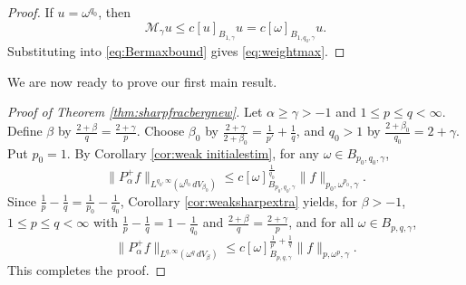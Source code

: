 \documentclass[a4paper,11pt,intlimits,oneside]{amsart}
\theoremstyle{definition}
\numberwithin{equation}{section}
\theoremstyle{definition}
\begin{document}
\begin{proof}
If $u=\omega^{q_0}$, then $$\mathcal{M}_{\gamma}u\le c[u]_{B_{1,\gamma}}u=c[\omega]_{B_{1,q_0,\gamma}}u.$$
Substituting into \eqref{eq:Bermaxbound} gives \eqref{eq:weightmax}.
\end{proof}
We are now ready to prove our first main result.
\begin{proof}[Proof of Theorem \ref{thm:sharpfracbergnew}]
Let $\alpha\geq \gamma>-1$ and $1\leq p\leq q<\infty$. Define $\beta$ by $\frac{2+\beta}{q}=\frac{2+\gamma}{p}$. Choose $\beta_0$ by $\frac{2+\gamma}{2+\beta_0}=\frac{1}{p'}+\frac{1}{q}$, and $q_0>1$ by $\frac{2+\beta_0}{q_0}=2+\gamma$. Put $p_0=1$. By Corollary \ref{cor:weak initialestim}, for any $\omega\in B_{p_0,q_0,\gamma}$,
$$\|P_{\alpha}^+f\|_{L^{q_0,\infty}(\omega^{q_0}\,{d}V_{\beta_0})}\le c[\omega]_{B_{p_0,q_0,\gamma}}^{\frac{1}{q_0}}\|f\|_{p_0,\omega^{p_0},\gamma}.$$
Since $\frac{1}{p}-\frac{1}{q}=\frac{1}{p_0}-\frac{1}{q_0}$, Corollary \ref{cor:weaksharpextra} yields, for $\beta>-1$, $1\le p\le q<\infty$ with $\frac{1}{p}-\frac{1}{q}=1-\frac{1}{q_0}$ and $\frac{2+\beta}{q}=\frac{2+\gamma}{p}$, and for all $\omega\in B_{p,q,\gamma}$,
\begin{equation}\label{eq:sharweakend1}\|P_{\alpha}^+f\|_{L^{q,\infty}(\omega^{q}\,{d}V_{\beta})}\le c[\omega]_{B_{p,q,\gamma}}^{\frac{1}{p'}+\frac{1}{q}}\|f\|_{p,\omega^p,\gamma}.\end{equation}
This completes the proof.
\end{proof}
\end{document}
